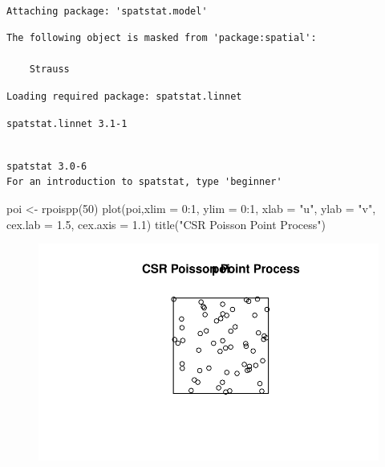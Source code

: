 \documentclass[
  letterpaper,
  DIV=11,
  numbers=noendperiod]{scrartcl}
\newenvironment{Shaded}{\begin{snugshade}}{\end{snugshade}}
\newcommand{\AttributeTok}[1]{\textcolor[rgb]{0.40,0.45,0.13}{#1}}
\newcommand{\DecValTok}[1]{\textcolor[rgb]{0.68,0.00,0.00}{#1}}
\newcommand{\FloatTok}[1]{\textcolor[rgb]{0.68,0.00,0.00}{#1}}
\newcommand{\FunctionTok}[1]{\textcolor[rgb]{0.28,0.35,0.67}{#1}}
\newcommand{\NormalTok}[1]{\textcolor[rgb]{0.00,0.23,0.31}{#1}}
\newcommand{\OtherTok}[1]{\textcolor[rgb]{0.00,0.23,0.31}{#1}}
\newcommand{\SpecialCharTok}[1]{\textcolor[rgb]{0.37,0.37,0.37}{#1}}
\newcommand{\StringTok}[1]{\textcolor[rgb]{0.13,0.47,0.30}{#1}}
\begin{document}
\begin{verbatim}

Attaching package: 'spatstat.model'
\end{verbatim}

\begin{verbatim}
The following object is masked from 'package:spatial':

    Strauss
\end{verbatim}

\begin{verbatim}
Loading required package: spatstat.linnet
\end{verbatim}

\begin{verbatim}
spatstat.linnet 3.1-1
\end{verbatim}

\begin{verbatim}

spatstat 3.0-6 
For an introduction to spatstat, type 'beginner' 
\end{verbatim}

\begin{Shaded}
\begin{Highlighting}[]
\NormalTok{poi }\OtherTok{\textless{}{-}} \FunctionTok{rpoispp}\NormalTok{(}\DecValTok{50}\NormalTok{)}
\FunctionTok{plot}\NormalTok{(poi,}\AttributeTok{xlim =} \DecValTok{0}\SpecialCharTok{:}\DecValTok{1}\NormalTok{, }\AttributeTok{ylim =} \DecValTok{0}\SpecialCharTok{:}\DecValTok{1}\NormalTok{, }\AttributeTok{xlab =} \StringTok{"u"}\NormalTok{, }\AttributeTok{ylab =} \StringTok{"v"}\NormalTok{, }
     \AttributeTok{cex.lab =} \FloatTok{1.5}\NormalTok{, }\AttributeTok{cex.axis =} \FloatTok{1.1}\NormalTok{)}
\FunctionTok{title}\NormalTok{(}\StringTok{"CSR Poisson Point Process"}\NormalTok{)}
\end{Highlighting}
\end{Shaded}

\begin{figure}[H]

{\centering \includegraphics{robby_homework_1---Copy_files/figure-pdf/unnamed-chunk-5-1.pdf}

}

\end{figure}
\end{document}
